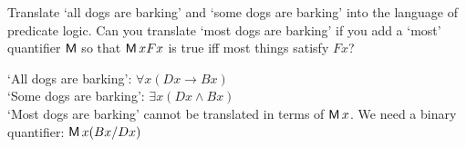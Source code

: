 \begin{exercise}
  Translate `all dogs are barking' and `some dogs are barking' into the language
  of predicate logic. Can you translate `most dogs are barking' if you add a
  `most' quantifier $\operatorname{\mathsf{M}}$ so that $\operatorname{\mathsf{M}} x Fx$ is true iff most things
  satisfy $Fx$?
\end{exercise}
\begin{solution}
  `All dogs are barking': $\forall x(Dx \to Bx)$\\
  `Some dogs are barking': $\exists x(Dx \land Bx)$\\
  `Most dogs are barking' cannot be translated in terms of $\operatorname{\mathsf{M}} x$. We need
  a binary quantifier: $\operatorname{\mathsf{M}} x(Bx / Dx)$
\end{solution}


